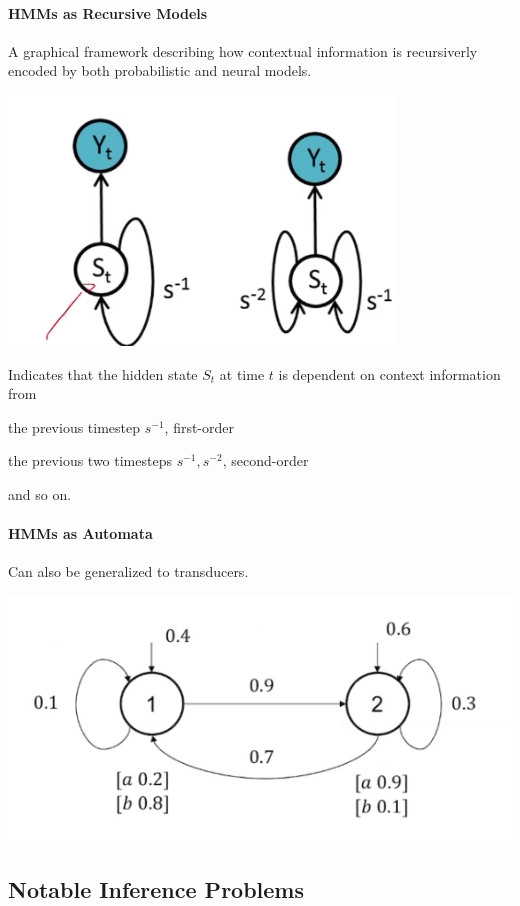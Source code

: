 \documentclass[10pt]{report}
\begin{document}
\paragraph{HMMs as Recursive Models} A graphical framework describing how contextual information is recursiverly encoded by both probabilistic and neural models.
\begin{center}
	\includegraphics[scale=0.5]{28.png}
\end{center}
Indicates that the hidden state $S_t$ at time $t$ is dependent on context information from
\begin{list}{}{}
	\item the previous timestep $s^{-1}$, first-order
	\item the previous two timesteps $s^{-1},s^{-2}$, second-order
\end{list}
and so on.
\paragraph{HMMs as Automata} Can also be generalized to transducers.
\begin{center}
	\includegraphics[scale=0.5]{29.png}
\end{center}
\pagebreak
\subsection{Notable Inference Problems}
\end{document}
